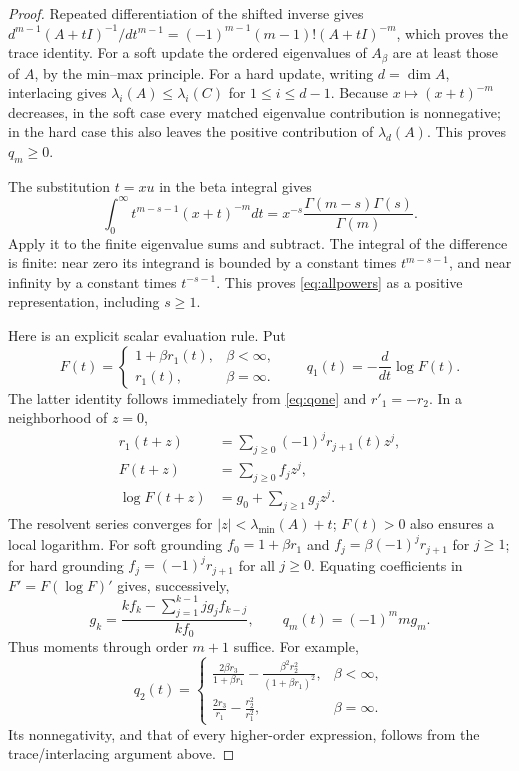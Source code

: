 \begin{proof}
Repeated differentiation of the shifted inverse gives
$d^{m-1}(A+tI)^{-1}/dt^{m-1}=(-1)^{m-1}(m-1)!(A+tI)^{-m}$,
which proves the trace identity. For a soft update the ordered
eigenvalues of $A_\beta$ are at least those of $A$, by the min--max
principle. For a hard update, writing $d=\dim A$, interlacing gives
$\lambda_i(A)\leq\lambda_i(C)$ for $1\leq i\leq d-1$.
Because $x\mapsto(x+t)^{-m}$ decreases, in the soft case every matched
eigenvalue contribution is nonnegative; in the hard case this also
leaves the positive contribution of $\lambda_d(A)$. This proves
$q_m\geq0$.

The substitution $t=xu$ in the beta integral gives
\[
 \int_0^\infty t^{m-s-1}(x+t)^{-m}dt
 =x^{-s}\frac{\Gamma(m-s)\Gamma(s)}{\Gamma(m)}.
\]
Apply it to the finite eigenvalue sums and subtract. The integral
of the difference is finite: near zero its integrand is bounded
by a constant times $t^{m-s-1}$, and near infinity by a constant
times $t^{-s-1}$. This proves \eqref{eq:allpowers} as a positive
representation, including $s\geq1$.

Here is an explicit scalar evaluation rule. Put
\[
 F(t)=\begin{cases}1+\beta r_1(t),&\beta<\infty,\\r_1(t),&\beta=\infty.
 \end{cases}
 \qquad q_1(t)=-\frac{d}{dt}\log F(t).
\]
The latter identity follows immediately from \eqref{eq:qone} and
$r'_1=-r_2$. In a neighborhood of $z=0$,
\begin{align*}
 r_1(t+z)&=\sum_{j\geq0}(-1)^j r_{j+1}(t)z^j,\\
 F(t+z)&=\sum_{j\geq0}f_jz^j,\\
 \log F(t+z)&=g_0+\sum_{j\geq1}g_jz^j.
\end{align*}
The resolvent series converges for $|z|<\lambda_{\min}(A)+t$;
$F(t)>0$ also ensures a local logarithm. For soft grounding
$f_0=1+\beta r_1$ and $f_j=\beta(-1)^jr_{j+1}$ for $j\geq1$;
for hard grounding $f_j=(-1)^jr_{j+1}$ for all $j\geq0$.
Equating coefficients in $F'=F(\log F)'$ gives, successively,
\begin{equation}\label{eq:logrecurrence}
 g_k=\frac{kf_k-\sum_{j=1}^{k-1}jg_jf_{k-j}}{kf_0},\qquad
 q_m(t)=(-1)^m m g_m.
\end{equation}
Thus moments through order $m+1$ suffice. For example,
\[
 q_2(t)=\begin{cases}
 \displaystyle\frac{2\beta r_3}{1+\beta r_1}
       -\frac{\beta^2r_2^2}{(1+\beta r_1)^2},&\beta<\infty,\\[6pt]
 \displaystyle\frac{2r_3}{r_1}-\frac{r_2^2}{r_1^2},&\beta=\infty.
 \end{cases}
\]
Its nonnegativity, and that of every higher-order expression, follows
from the trace/interlacing argument above.
\end{proof}


